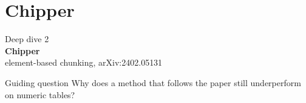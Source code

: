 \documentclass[aspectratio=169,11pt]{beamer}
\begin{document}
\section{Chipper}

\begin{frame}[plain]
  \vfill
  \begin{center}
    {\color{brand}\Large Deep dive 2}\\[0.5em]
    {\Huge\bfseries Chipper}\\[0.45em]
    {\large element-based chunking, arXiv:2402.05131}
  \end{center}
  \vfill
  \begin{block}{Guiding question}
    \centering
    Why does a method that follows the paper still underperform on numeric tables?
  \end{block}
\end{frame}
\end{document}
